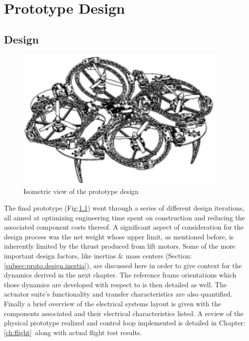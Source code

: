 \chapter{Prototype Design}
\label{ch:proto}
\section{Design}
\label{sec:proto.design}
\begin{figure}[htbp]
\centering
\includegraphics[width=0.93\textwidth]{figs/iso-design}
\caption{Isometric view of the prototype design}
\label{fig:iso-design}
\end{figure}
The final prototype (Fig:\ref{fig:iso-design}) went through a series of different design iterations, all aimed at optimizing engineering time spent on construction and reducing the associated component costs thereof. A significant aspect of consideration for the design process was the net weight whose upper limit, as mentioned before, is inherently limited by the thrust produced from lift motors. Some of the more important design factors, like inertias \& mass centers (Section:\ref{subsec:proto.design.inertia}), are discussed here in order to give context for the dynamics derived in the next chapter. The reference frame orientations which those dynamics are developed with respect to is then detailed as well. The actuator suite's functionality and transfer characteristics are also quantified.  Finally a brief overview of the electrical systems layout is given with the components associated and their electrical characteristics listed. A review of the physical prototype realized and control loop implemented is detailed in Chapter:\ref{ch:flight}~along with actual flight test results.
\newpage
